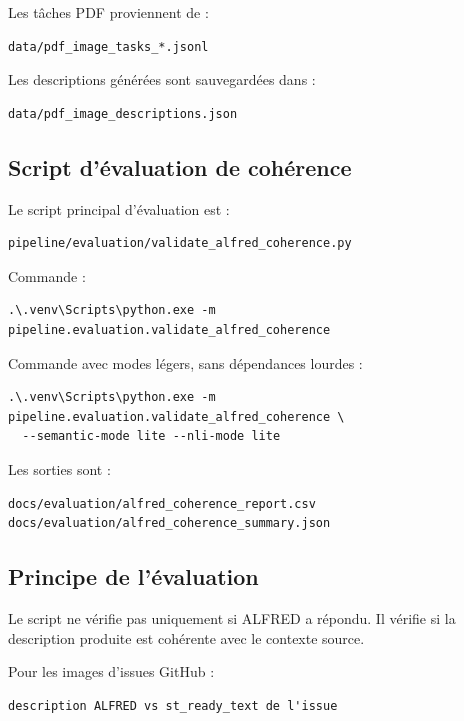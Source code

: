 \documentclass[11pt,a4paper]{article}
\begin{document}
Les tâches PDF proviennent de :

\begin{verbatim}
data/pdf_image_tasks_*.jsonl
\end{verbatim}

Les descriptions générées sont sauvegardées dans :

\begin{verbatim}
data/pdf_image_descriptions.json
\end{verbatim}

\subsection{Script d'évaluation de cohérence}

Le script principal d'évaluation est :

\begin{verbatim}
pipeline/evaluation/validate_alfred_coherence.py
\end{verbatim}

Commande :

\begin{verbatim}
.\.venv\Scripts\python.exe -m pipeline.evaluation.validate_alfred_coherence
\end{verbatim}

Commande avec modes légers, sans dépendances lourdes :

\begin{verbatim}
.\.venv\Scripts\python.exe -m pipeline.evaluation.validate_alfred_coherence \
  --semantic-mode lite --nli-mode lite
\end{verbatim}

Les sorties sont :

\begin{verbatim}
docs/evaluation/alfred_coherence_report.csv
docs/evaluation/alfred_coherence_summary.json
\end{verbatim}

\subsection{Principe de l'évaluation}

Le script ne vérifie pas uniquement si ALFRED a répondu. Il vérifie si la description produite est cohérente avec le contexte source.

Pour les images d'issues GitHub :

\begin{verbatim}
description ALFRED vs st_ready_text de l'issue
\end{verbatim}
\end{document}
